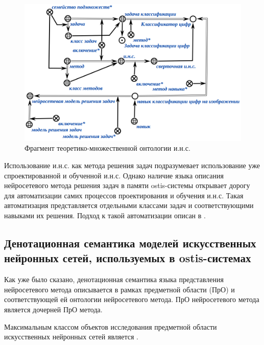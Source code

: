 \begin{figure}[H]
	\centering
	\includegraphics[scale=0.5]{author/part3/figures/actions_concepts.png}
	\caption{Фрагмент теоретико-множественной онтологии и.н.с.}
	\label{fig:actions_concepts}
\end{figure}

Использование и.н.с. как метода решения задач подразумевает использование уже спроектированной и обученной и.н.с. Однако наличие языка описания нейросетевого метода решения задач в памяти ostis-системы открывает дорогу для автоматизации самих процессов проектирования и обучения и.н.с. Такая автоматизация представляется отдельными классами задач и соответствующими навыками их решения. Подход к такой автоматизации описан в \textbf{}.

\subsection{Денотационная семантика моделей искусственных нейронных сетей, используемых в ostis-системах}

Как уже было сказано, денотационная семантика языка представления нейросетевого метода описывается в рамках предметной области (ПрО) и соответствующей ей онтологии нейросетевого метода. ПрО нейросетевого метода является дочерней ПрО метода.

Максимальным классом объектов исследования предметной области искусственных нейронных сетей является .

\begin{SCn}
\end{SCn}

